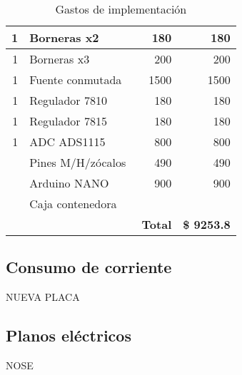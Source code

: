 \begin{table}[h]
\begin{tabular}{|r|l|l|r|r|}
		1 & Borneras x2 &  & 180 & 180 \\ \hline
		1 & Borneras x3 &  & 200 & 200 \\ \hline
		1 & Fuente conmutada &  & 1500 & 1500 \\ \hline
		1 & Regulador 7810 &  & 180 & 180 \\ \hline
		1 & Regulador 7815 &  & 180 & 180 \\ \hline
		1 & ADC ADS1115 &  & 800 & 800 \\ \hline
		\multicolumn{1}{|l|}{} & Pines M/H/zócalos &  & 490 & 490 \\ \hline
		\multicolumn{1}{|l|}{} & Arduino NANO &  & 900 & 900 \\ \hline
		\multicolumn{1}{|l|}{} & Caja contenedora &  & \multicolumn{1}{l|}{} & \multicolumn{1}{l|}{} \\ \hline
		\multicolumn{4}{|r|}{\textbf{Total}} & \multicolumn{1}{c|}{\textbf{\$ 9253.8}} \\ \hline
	\end{tabular}
\caption{Gastos de implementación}
\label{gastos}

\end{table}

\subsection{Consumo de corriente}
NUEVA PLACA


\subsection{Planos eléctricos}
NOSE

